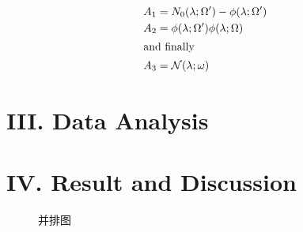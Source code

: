 \documentclass{article}
\begin{document}
\begin{align}
  A_1 &= N_0 (\lambda ; \Omega')
         -  \phi ( \lambda ; \Omega')   \\
  A_2 &= \phi (\lambda ; \Omega')
            \phi (\lambda ; \Omega)     \\
\intertext{and finally}
  A_3 &= \mathcal{N} (\lambda ; \omega)
\end{align}


\section{III. Data Analysis}



\section{IV. Result and Discussion}

\begin{figure}[h]
  \caption{并排图}
\end{figure}
\end{document}
